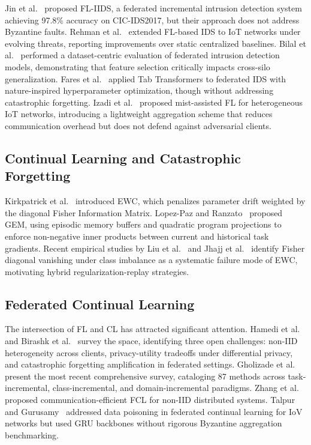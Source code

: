 \documentclass[journal,10pt,twocolumn]{IEEEtran}
\begin{document}
Jin et al.~\cite{jin2024fliids} proposed FL-IIDS, a federated incremental intrusion detection system achieving 97.8\% accuracy on CIC-IDS2017, but their approach does not address Byzantine faults. Rehman et al.~\cite{rehman2026incremental} extended FL-based IDS to IoT networks under evolving threats, reporting improvements over static centralized baselines. Bilal et al.~\cite{bilal2026dataset} performed a dataset-centric evaluation of federated intrusion detection models, demonstrating that feature selection critically impacts cross-silo generalization. Fares et al.~\cite{fares2025federated} applied Tab Transformers to federated IDS with nature-inspired hyperparameter optimization, though without addressing catastrophic forgetting. Izadi et al.~\cite{izadi2025mist} proposed mist-assisted FL for heterogeneous IoT networks, introducing a lightweight aggregation scheme that reduces communication overhead but does not defend against adversarial clients.

\subsection{Continual Learning and Catastrophic Forgetting}
Kirkpatrick et al.~\cite{kirkpatrick2017overcoming} introduced EWC, which penalizes parameter drift weighted by the diagonal Fisher Information Matrix. Lopez-Paz and Ranzato~\cite{lopez2017gradient} proposed GEM, using episodic memory buffers and quadratic program projections to enforce non-negative inner products between current and historical task gradients. Recent empirical studies by Liu et al.~\cite{liu2026ewc} and Jhajj et al.~\cite{jhajj2025elastic} identify Fisher diagonal vanishing under class imbalance as a systematic failure mode of EWC, motivating hybrid regularization-replay strategies.

\subsection{Federated Continual Learning}
The intersection of FL and CL has attracted significant attention. Hamedi et al.~\cite{hamedi2025federated} and Birashk et al.~\cite{birashk2025federated} survey the space, identifying three open challenges: non-IID heterogeneity across clients, privacy-utility tradeoffs under differential privacy, and catastrophic forgetting amplification in federated settings. Gholizade et al.~\cite{gholizade2026federated} present the most recent comprehensive survey, cataloging 87 methods across task-incremental, class-incremental, and domain-incremental paradigms. Zhang et al.~\cite{zhang2023communication} proposed communication-efficient FCL for non-IID distributed systems. Talpur and Gurusamy~\cite{talpur2022gfcl} addressed data poisoning in federated continual learning for IoV networks but used GRU backbones without rigorous Byzantine aggregation benchmarking.
\end{document}
